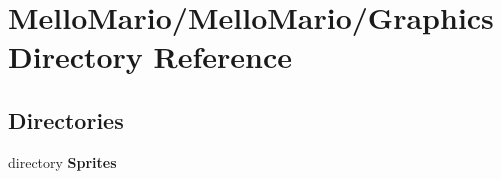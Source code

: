 \section{Mello\+Mario/\+Mello\+Mario/\+Graphics Directory Reference}
\label{dir_44542bc1bd54897d9eae13acc68c7e2a}
\subsection*{Directories}
\begin{DoxyCompactItemize}
\item 
directory \textbf{ Sprites}
\end{DoxyCompactItemize}
